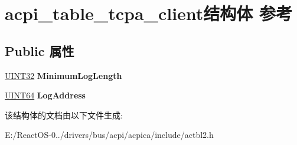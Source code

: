 \hypertarget{structacpi__table__tcpa__client}{}\section{acpi\+\_\+table\+\_\+tcpa\+\_\+client结构体 参考}
\label{structacpi__table__tcpa__client}
\subsection*{Public 属性}
\begin{DoxyCompactItemize}
\item 
\mbox{\label{structacpi__table__tcpa__client_a2a7ed0221456bf1a7028675537e2116d}} 
\hyperlink{_processor_bind_8h_ae1e6edbbc26d6fbc71a90190d0266018}{U\+I\+N\+T32} {\bfseries Minimum\+Log\+Length}
\item 
\mbox{\label{structacpi__table__tcpa__client_a78a193960cc387ab0aacdad6e355e630}} 
\hyperlink{_processor_bind_8h_a57be03562867144161c1bfee95ca8f7c}{U\+I\+N\+T64} {\bfseries Log\+Address}
\end{DoxyCompactItemize}


该结构体的文档由以下文件生成\+:\begin{DoxyCompactItemize}
\item 
E\+:/\+React\+O\+S-\/0../drivers/bus/acpi/acpica/include/actbl2.\+h\end{DoxyCompactItemize}
